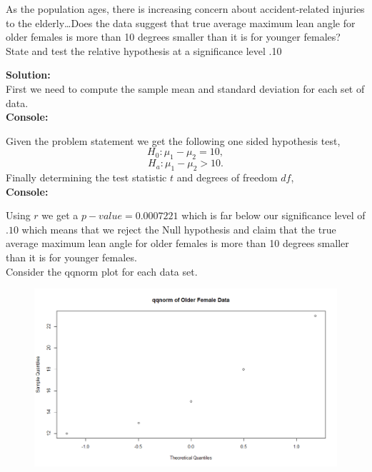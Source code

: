 \documentclass[12pt]{article}
\makeatletter
\theoremstyle{homework}
\newenvironment{exercise}[1]
{\def\@currentlabel{#1}\exercisecore}
{\endexercisecore}
\newcommand{\localhead}[1]{\par\smallskip\noindent\textbf{#1}\nobreak\\}%
\newcommand\solution{\localhead{Solution:}}
\makeatother
\begin{document}
\begin{exercise}{9.28} As the population ages, there is increasing concern about accident-related injuries to the elderly\dots Does the data suggest
  that true average maximum lean angle for older females is more than 10 degrees smaller than it is for younger females? State and test the relative hypothesis
  at a significance level .10\\

  \solution First we need to compute the sample mean and standard deviation for each set of data.\\
  \textbf{Console:}
  \begin{center}
  
  \end{center}
  Given the problem statement we get the following one sided hypothesis test,
  \begin{equation*}
    H_0:\mu_1 - \mu_2 = 10,
  \end{equation*}
  \begin{equation*}
    H_a:\mu_1 - \mu_2 > 10.
  \end{equation*}
Finally determining the test statistic $t$ and degrees of freedom $df$,\\
\textbf{Console:}
\begin{center}

\end{center}
Using $r$ we get a $p-value = 0.0007221$ which is far below our significance level of $.10$ which means that we reject the Null hypothesis
and claim that the true average maximum lean angle for older females is more than 10 degrees smaller than it is for younger females.\\

Consider the qqnorm plot for each data set.\\
\begin{figure}[H]
  \includegraphics[width = \textwidth]{OF.png}  
  \centering
\end{figure}


\end{exercise}
\end{document}
